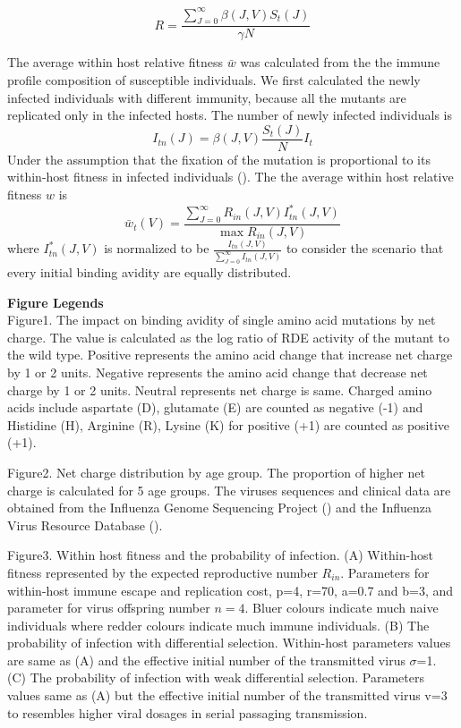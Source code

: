 \documentclass[12pt,a4paper]{article}
\begin{document}
\begin{equation}
R=\frac{\sum_{J=0}^{\infty}\beta(J,V)S_{t}(J)}{\gamma N}
\end{equation}

The average within host relative fitness $\bar{w}$ was calculated from the the immune profile composition of susceptible individuals. We first calculated the newly infected individuals with different immunity, because all the mutants are replicated only in the infected hosts. The number of newly infected individuals is
\begin{equation}
I_{tn}(J) = \beta(J,V)\frac{S_{t}(J)}{N} {I_{t}}
\end{equation}
Under the assumption that the fixation of the mutation is proportional to its within-host fitness in infected individuals (\cite{Gillespie1984}). The the average within host relative fitness $w$ is
\begin{equation}
\bar{w}_{t}(V)=\frac{\sum_{J=0}^{\infty} R_{in}(J,V)I_{tn}^*(J,V)}{\max{R_{in}(J,V)}}
\end{equation}
where $I_{tn}^*(J,V)$ is normalized to be $\frac{I_{tn}(J,V)}{\sum_{J=0}^{\infty}I_{tn}(J,V)}$ to consider the scenario that every initial binding avidity are equally distributed. 

\clearpage

{\bf Figure Legends} \\
Figure1. The impact on binding avidity of single amino acid mutations by net charge. The value is calculated as the log ratio of RDE activity of the mutant to the wild type. Positive represents the amino acid change that increase net charge by 1 or 2 units. Negative represents the amino acid change that decrease net charge by 1 or 2 units. Neutral represents net charge is same. Charged amino acids include aspartate (D), glutamate (E) are counted as negative (-1) and Histidine (H), Arginine (R), Lysine (K) for positive (+1) are counted as positive (+1).
      

Figure2. Net charge distribution by age group. The proportion of higher net charge is calculated for 5 age groups. The viruses sequences and clinical data are obtained from the Influenza Genome Sequencing Project (\cite{Ghedin2005}) and the Influenza Virus Resource Database (\cite{Bao2008}).  

Figure3. Within host fitness and the probability of infection. (A) Within-host fitness represented by the expected reproductive number $R_{in}$. Parameters for within-host immune escape and replication cost, p=4, r=70, a=0.7 and b=3, and parameter for virus offspring number $n=4$. Bluer colours indicate much naive individuals where redder colours indicate much immune individuals. (B) The probability of infection with differential selection. Within-host parameters values are same as (A) and the effective initial number of the transmitted virus $\sigma$=1. (C) The probability of infection with weak differential selection. Parameters values same as (A) but the effective initial number of the transmitted virus v=3 to resembles higher viral dosages in serial passaging transmission. 
\end{document}
